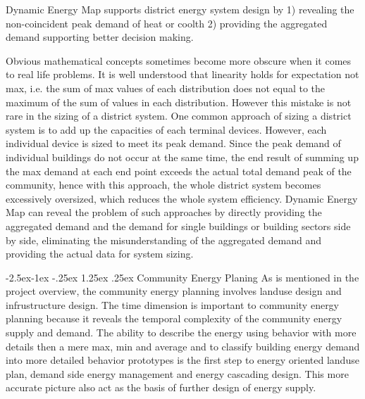 \documentclass[hidelinks,12pt]{article}
\makeatletter
\renewcommand\paragraph{\@startsection{paragraph}{4}{\z@}%
            {-2.5ex\@plus -1ex \@minus -.25ex}%
            {1.25ex \@plus .25ex}%
            {\normalfont\normalsize\bfseries}}
\makeatother
\begin{document}
Dynamic Energy Map supports district energy system design by 1)
revealing the non-coincident peak demand of heat or coolth 2)
providing the aggregated demand supporting better decision making.

Obvious mathematical concepts sometimes become more obscure when it
comes to real life problems. It is well understood that linearity
holds for expectation not max, i.e. the sum of max values of each
distribution does not equal to the maximum of the sum of values in
each distribution. However this mistake is not rare in the sizing of a
district system. One common approach of sizing a district system is to
add up the capacities of each terminal devices. However, each
individual device is sized to meet its peak demand. Since the peak
demand of individual buildings do not occur at the same time, the end
result of summing up the max demand at each end point exceeds the
actual total demand peak of the community, hence with this approach,
the whole district system becomes excessively oversized, which reduces
the whole system efficiency. Dynamic Energy Map can reveal the problem
of such approaches by directly providing the aggregated demand and the
demand for single buildings or building sectors side by side,
eliminating the misunderstanding of the aggregated demand and
providing the actual data for system sizing.

\paragraph{Community Energy Planing}
As is mentioned in the project overview, the community energy planning
involves landuse design and infrustructure design. The time dimension
is important to community energy planning because it reveals the
temporal complexity of the community energy supply and demand. The
ability to describe the energy using behavior with more details then a
mere max, min and average and to classify building energy demand into
more detailed behavior prototypes is the first step to energy oriented
landuse plan, demand side energy management and energy cascading
design. This more accurate picture also act as the basis of further
design of energy supply.
\end{document}
